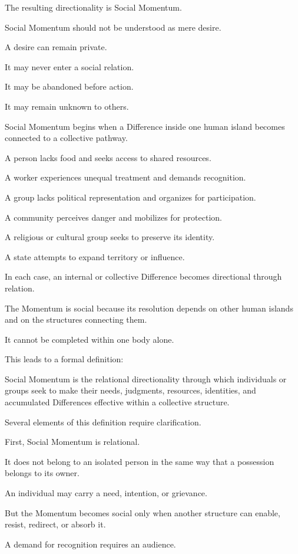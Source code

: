 The resulting directionality is Social Momentum.

Social Momentum should not be understood as mere desire.

A desire can remain private.

It may never enter a social relation.

It may be abandoned before action.

It may remain unknown to others.

Social Momentum begins when a Difference inside one human island becomes connected to a collective pathway.

A person lacks food and seeks access to shared resources.

A worker experiences unequal treatment and demands recognition.

A group lacks political representation and organizes for participation.

A community perceives danger and mobilizes for protection.

A religious or cultural group seeks to preserve its identity.

A state attempts to expand territory or influence.

In each case, an internal or collective Difference becomes directional through relation.

The Momentum is social because its resolution depends on other human islands and on the structures connecting them.

It cannot be completed within one body alone.

This leads to a formal definition:

Social Momentum is the relational directionality through which individuals or groups seek to make their needs, judgments, resources, identities, and accumulated Differences effective within a collective structure.

Several elements of this definition require clarification.

First, Social Momentum is relational.

It does not belong to an isolated person in the same way that a possession belongs to its owner.

An individual may carry a need, intention, or grievance.

But the Momentum becomes social only when another structure can enable, resist, redirect, or absorb it.

A demand for recognition requires an audience.

